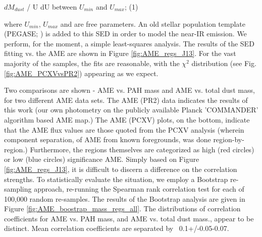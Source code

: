 \documentclass[preprint2,longabstract]{aastex}
\begin{document}
     $dM_{dust}$ / U dU between $U_{min}$ and $U_{max}$; (1)

where $U_{min}$, $U_{max}$ and  are free parameters. An old stellar population template (PEGASE; \citep{fioc97}) is added to this SED in order to model the near-IR emission. We perform, for the moment, a simple least-squares analysis. The results of the SED fitting vs. the AME are shown in Figure \ref{fig:AME_regs_J13}. For the vast majority of the samples, the fits are reasonable, with the $\chi^{2}$ distribution (see Fig. \ref{fig:AME_PCXVvsPR2}) appearing as we expect.
     
     Two comparisons are shown - AME vs. PAH mass and AME vs. total dust mass, for two different AME data sets. The AME (PR2) data indicates the results of this work (our own photometry on the publicly available Planck 'COMMANDER' algorithm based AME map.) The AME (PCXV) plots, on the bottom, indicate that the AME flux values are those quoted from the PCXV analysis (wherein component separation, of AME from known foregrounds, was done region-by-region.) Furthermore, the regions themselves are categorized as high (red circles) or low (blue circles) significance AME. Simply based on Figure \ref{fig:AME_regs_J13}, it is difficult to discern a difference on the correlation strengths. To statistically evaluate the situation, we employ a Bootstrap re-sampling approach, re-running the Spearman rank correlation test for each of 100,000 random re-samples. The results of the Bootstrap analysis are given in Figure \ref{fig:AME_boostrap_mass_regs_all}. The distributions of correlation coefficients for AME vs. PAH mass, and AME vs. total dust mass., appear to be distinct. Mean correlation coefficients are separated by ~0.1+/-0.05-0.07.
     
\end{document}
